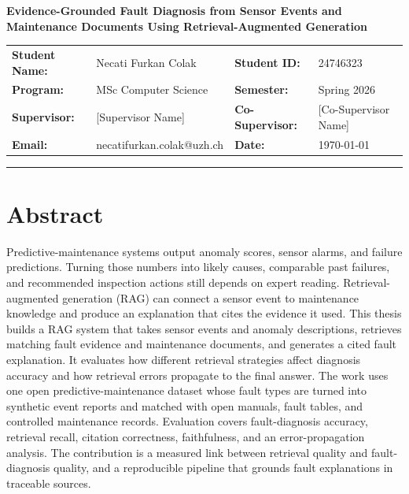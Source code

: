 \documentclass[10pt,a4paper]{article}
\begin{document}
\begin{center}
    {\Large \textbf{Evidence-Grounded Fault Diagnosis from Sensor Events and\\[0.15em]Maintenance Documents Using Retrieval-Augmented Generation}}
\end{center}

\vspace{0.35em}

\noindent
\begin{tabularx}{\textwidth}{>{\bfseries}l X >{\bfseries}l X}
Student Name: & Necati Furkan Colak       & Student ID:     & 24746323 \\
Program:      & MSc Computer Science      & Semester:       & Spring 2026 \\
Supervisor:   & [Supervisor Name]         & Co-Supervisor:  & [Co-Supervisor Name] \\
Email:        & necatifurkan.colak@uzh.ch & Date:           & \today \\
\end{tabularx}

\vspace{0.5em}
\hrule
\vspace{0.5em}

\section{Abstract}

Predictive-maintenance systems output anomaly scores, sensor alarms, and failure predictions. Turning those numbers into likely causes, comparable past failures, and recommended inspection actions still depends on expert reading. Retrieval-augmented generation (RAG) \cite{lewis2020rag} can connect a sensor event to maintenance knowledge and produce an explanation that cites the evidence it used. This thesis builds a RAG system that takes sensor events and anomaly descriptions, retrieves matching fault evidence and maintenance documents, and generates a cited fault explanation. It evaluates how different retrieval strategies affect diagnosis accuracy and how retrieval errors propagate to the final answer. The work uses one open predictive-maintenance dataset whose fault types are turned into synthetic event reports and matched with open manuals, fault tables, and controlled maintenance records. Evaluation covers fault-diagnosis accuracy, retrieval recall, citation correctness, faithfulness, and an error-propagation analysis. The contribution is a measured link between retrieval quality and fault-diagnosis quality, and a reproducible pipeline that grounds fault explanations in traceable sources.
\end{document}
